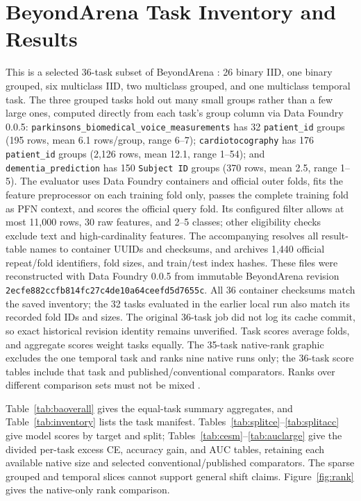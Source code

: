 \documentclass{article}
\begin{document}
\section{BeyondArena Task Inventory and Results}\label{app:beyond}
This is a selected 36-task subset of BeyondArena \citep{purucker2026beyondarena}: 26 binary IID, one binary grouped, six multiclass IID, two multiclass grouped, and one multiclass temporal task. The three grouped tasks hold out many small groups rather than a few large ones, computed directly from each task's group column via Data Foundry 0.0.5: \texttt{parkinsons\_biomedical\_voice\_measurements} has 32 \texttt{patient\_id} groups (195 rows, mean 6.1 rows/group, range 6--7); \texttt{cardiotocography} has 176 \texttt{patient\_id} groups (2,126 rows, mean 12.1, range 1--54); and \texttt{dementia\_prediction} has 150 \texttt{Subject ID} groups (370 rows, mean 2.5, range 1--5). The evaluator uses Data Foundry containers and official outer folds, fits the feature preprocessor on each training fold only, passes the complete training fold as PFN context, and scores the official query fold. Its configured filter allows at most 11,000 rows, 30 raw features, and 2--5 classes; other eligibility checks exclude text and high-cardinality features. The accompanying  resolves all result-table names to container UUIDs and checksums, and  archives 1,440 official repeat/fold identifiers, fold sizes, and train/test index hashes. These files were reconstructed with Data Foundry 0.0.5 from immutable BeyondArena revision \texttt{2ecfe882ccfb814fc27c4de10a64ceefd5d7655c}. All 36 container checksums match the saved inventory; the 32 tasks evaluated in the earlier local run also match its recorded fold IDs and sizes. The original 36-task job did not log its cache commit, so exact historical revision identity remains unverified. Task scores average folds, and aggregate scores weight tasks equally. The 35-task native-rank graphic excludes the one temporal task and ranks nine native runs only; the 36-task score tables include that task and published/conventional comparators. Ranks over different comparison sets must not be mixed \citep{demsar2006comparisons}.



Table~\ref{tab:baoverall} gives the equal-task summary aggregates, and Table~\ref{tab:inventory} lists the task manifest. Tables~\ref{tab:splitce}--\ref{tab:splitacc} give model scores by target and split; Tables~\ref{tab:cesm}--\ref{tab:auclarge} give the divided per-task excess CE, accuracy gain, and AUC tables, retaining each available native size and selected conventional/published comparators. The sparse grouped and temporal slices cannot support general shift claims. Figure~\ref{fig:rank} gives the native-only rank comparison.
\end{document}
